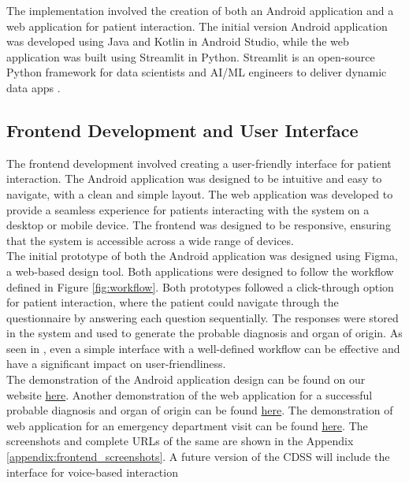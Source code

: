 \noindent The implementation involved the creation of both an Android application and a web application for patient interaction. The initial version Android application was developed using Java and Kotlin in Android Studio, while the web application was built using Streamlit in Python. Streamlit is an open-source Python framework for data scientists and AI/ML engineers to deliver dynamic data apps \cite{streamlit}. 

\subsection{Frontend Development and User Interface}
The frontend development involved creating a user-friendly interface for patient interaction. The Android application was designed to be intuitive and easy to navigate, with a clean and simple layout. The web application was developed to provide a seamless experience for patients interacting with the system on a desktop or mobile device. The frontend was designed to be responsive, ensuring that the system is accessible across a wide range of devices.\\[\baselineskip]

\noindent The initial prototype of both the Android application was designed using Figma, a web-based design tool. Both applications were designed to follow the workflow defined in Figure \ref{fig:workflow}. Both prototypes followed a click-through option for patient interaction, where the patient could navigate through the questionnaire by answering each question sequentially. The responses were stored in the system and used to generate the probable diagnosis and organ of origin. As seen in \cite{eich1999internet}, even a simple interface with a well-defined workflow can be effective and have a significant impact on user-friendliness.\\[\baselineskip]

\noindent The demonstration of the Android application design can be found on our website \href{https://kutumlab.github.io/abdominal-pain-cdss/#mobile-application}{here}. Another demonstration of the web application for a successful probable diagnosis and organ of origin can be found \href{https://kutumlab.github.io/abdominal-pain-cdss/#web-application-diagnosis}{here}. The demonstration of web application for an emergency department visit can be found \href{https://kutumlab.github.io/abdominal-pain-cdss/#web-application-emergency-visit}{here}. The screenshots and complete URLs of the same are shown in the Appendix \ref{appendix:frontend_screenshots}. A future version of the CDSS will include the interface for voice-based interaction

